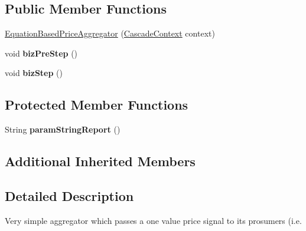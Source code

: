 \subsection*{Public Member Functions}
\begin{DoxyCompactItemize}
\item 
\hyperlink{classuk_1_1ac_1_1dmu_1_1iesd_1_1cascade_1_1agents_1_1aggregators_1_1_equation_based_price_aggregator_a77325b6ac17c8508195b5088461cd652}{Equation\-Based\-Price\-Aggregator} (\hyperlink{classuk_1_1ac_1_1dmu_1_1iesd_1_1cascade_1_1context_1_1_cascade_context}{Cascade\-Context} context)
\item 
\hypertarget{classuk_1_1ac_1_1dmu_1_1iesd_1_1cascade_1_1agents_1_1aggregators_1_1_equation_based_price_aggregator_a8d97ba93c24e83d8940fe56d2401df45}{void {\bfseries biz\-Pre\-Step} ()}\label{classuk_1_1ac_1_1dmu_1_1iesd_1_1cascade_1_1agents_1_1aggregators_1_1_equation_based_price_aggregator_a8d97ba93c24e83d8940fe56d2401df45}

\item 
\hypertarget{classuk_1_1ac_1_1dmu_1_1iesd_1_1cascade_1_1agents_1_1aggregators_1_1_equation_based_price_aggregator_a7ea15c30e7fc76b76818e61766a31839}{void {\bfseries biz\-Step} ()}\label{classuk_1_1ac_1_1dmu_1_1iesd_1_1cascade_1_1agents_1_1aggregators_1_1_equation_based_price_aggregator_a7ea15c30e7fc76b76818e61766a31839}

\end{DoxyCompactItemize}
\subsection*{Protected Member Functions}
\begin{DoxyCompactItemize}
\item 
\hypertarget{classuk_1_1ac_1_1dmu_1_1iesd_1_1cascade_1_1agents_1_1aggregators_1_1_equation_based_price_aggregator_a81bb2309e9086db4757c8694ed164831}{String {\bfseries param\-String\-Report} ()}\label{classuk_1_1ac_1_1dmu_1_1iesd_1_1cascade_1_1agents_1_1aggregators_1_1_equation_based_price_aggregator_a81bb2309e9086db4757c8694ed164831}

\end{DoxyCompactItemize}
\subsection*{Additional Inherited Members}


\subsection{Detailed Description}
Very simple aggregator which passes a one value price signal to its prosumers (i.\-e. 

